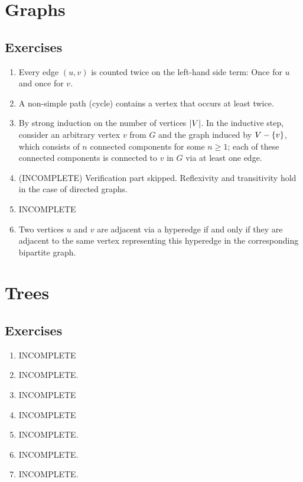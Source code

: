 \section{Graphs}
\subsection*{Exercises}
\begin{enumerate}[\thesection-1]
%
\item Every edge $(u, v)$ is counted twice on the left-hand side term: Once for $u$ and once for $v$.
%
\item A non-simple path (cycle) contains a vertex that occurs at least twice.
%
\item By strong induction on the number of vertices $\left|V\right|$. In the inductive step, consider an arbitrary vertex $v$ from $G$ and the graph induced by $V - \left\{v\right\}$, which consists of $n$ connected components for some $n \geq 1$; each of these connected components is connected to $v$ in $G$ via at least one edge.
%
\item (INCOMPLETE) Verification part skipped. Reflexivity and transitivity hold in the case of directed graphs.
%
\item INCOMPLETE
%
\item Two vertices $u$ and $v$ are adjacent via a hyperedge if and only if they are adjacent to the same vertex representing this hyperedge in the corresponding bipartite graph.
%
\end{enumerate}

\section{Trees}
\subsection*{Exercises}
\begin{enumerate}[\thesection-1]
%
\item INCOMPLETE
%
\item INCOMPLETE.
%
\item INCOMPLETE
%
\item INCOMPLETE
%
\item INCOMPLETE.
%
\item INCOMPLETE.
%
\item INCOMPLETE.
%
\end{enumerate}

